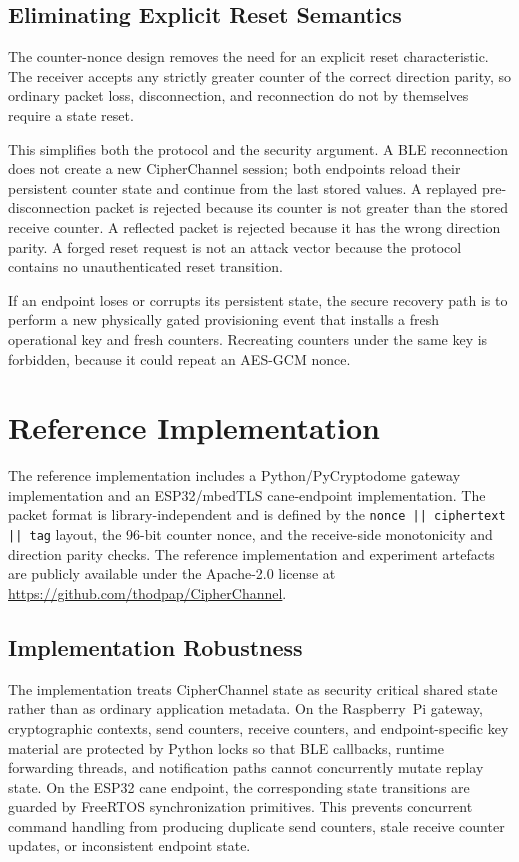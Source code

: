 \documentclass[journal]{IEEEtran}
\begin{document}
\subsection{Eliminating Explicit Reset Semantics}
\label{sec:reset}
The counter-nonce design removes the need for an explicit reset characteristic. The receiver accepts any strictly greater counter of the correct direction parity, so ordinary packet loss, disconnection, and reconnection do not by themselves require a state reset.

This simplifies both the protocol and the security argument. A BLE reconnection does not create a new CipherChannel session; both endpoints reload their persistent counter state and continue from the last stored values. A replayed pre-disconnection packet is rejected because its counter is not greater than the stored receive counter. A reflected packet is rejected because it has the wrong direction parity. A forged reset request is not an attack vector because the protocol contains no unauthenticated reset transition.

If an endpoint loses or corrupts its persistent state, the secure recovery path is to perform a new physically gated provisioning event that installs a fresh operational key and fresh counters. Recreating counters under the same key is forbidden, because it could repeat an AES-GCM nonce.

\section{Reference Implementation}
\label{sec:impl}

The reference implementation includes a Python/PyCryptodome gateway implementation and an ESP32/mbedTLS cane-endpoint implementation. The packet format is library-independent and is defined by the \texttt{nonce || ciphertext || tag} layout, the 96-bit counter nonce, and the receive-side monotonicity and direction parity checks. The reference implementation and experiment artefacts are publicly available under the Apache-2.0 license at \url{https://github.com/thodpap/CipherChannel}.

\subsection{Implementation Robustness}
\label{sec:impl-robustness}

The implementation treats CipherChannel state as security critical shared state rather than as ordinary application metadata. On the Raspberry~Pi gateway, cryptographic contexts, send counters, receive counters, and endpoint-specific key material are protected by Python locks so that BLE callbacks, runtime forwarding threads, and notification paths cannot concurrently mutate replay state. On the ESP32 cane endpoint, the corresponding state transitions are guarded by FreeRTOS synchronization primitives. This prevents concurrent command handling from producing duplicate send counters, stale receive counter updates, or inconsistent endpoint state.
\end{document}
